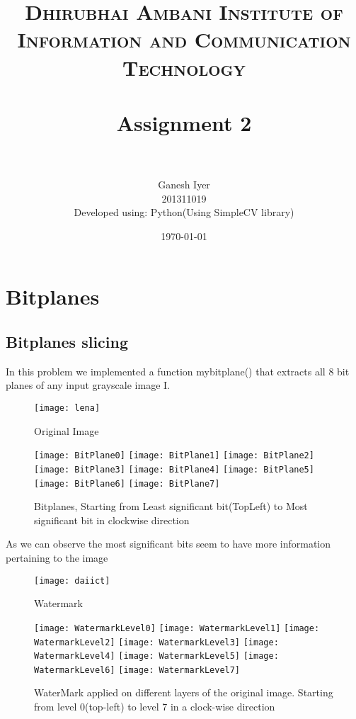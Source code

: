 \documentclass[paper=a4, fontsize=11pt]{scrartcl} %
\title{	
\normalfont \normalsize 
\textsc{Dhirubhai Ambani Institute of Information and Communication Technology} \\ [25pt] %
\horrule{0.5pt} \\[0.4cm] %
\huge Assignment 2 \\ %
\horrule{2pt} \\[0.5cm] %
}
\author{Ganesh Iyer \\ 201311019 \\Developed using: Python(Using SimpleCV library)}
\date{\normalsize\today} %
\numberwithin{equation}{section} %
\numberwithin{figure}{section} %
\numberwithin{table}{section} %
\begin{document}
\maketitle %


\section{Bitplanes}

    \subsection{Bitplanes slicing}
    In this problem we implemented a function mybitplane() that extracts all 8 bit planes of any input grayscale image I. 
    \begin{figure}[h!]
        \centering
        \texttt{[image: lena]}
        \caption{Original Image}
    \end{figure}
    \begin{figure}[h!]
        \centering
        \texttt{[image: BitPlane0]}
        \texttt{[image: BitPlane1]}
        \texttt{[image: BitPlane2]}
        \texttt{[image: BitPlane3]}
        \texttt{[image: BitPlane4]}
        \texttt{[image: BitPlane5]}
        \texttt{[image: BitPlane6]}
        \texttt{[image: BitPlane7]}
        \caption{Bitplanes, Starting from Least significant bit(TopLeft) to Most significant bit in clockwise direction}
    \end{figure}
    As we can observe the most significant bits seem to have more information pertaining to the image
    \begin{figure}[h!]
        \centering
        \texttt{[image: daiict]}
        \caption{Watermark}
    \end{figure}
    \begin{figure}[h!]
        \centering
        \texttt{[image: WatermarkLevel0]}
        \texttt{[image: WatermarkLevel1]}
        \texttt{[image: WatermarkLevel2]}
        \texttt{[image: WatermarkLevel3]}
        \texttt{[image: WatermarkLevel4]}
        \texttt{[image: WatermarkLevel5]}
        \texttt{[image: WatermarkLevel6]}
        \texttt{[image: WatermarkLevel7]}
        \caption{WaterMark applied on different layers of the original image. Starting from level 0(top-left) to level 7 in a clock-wise direction}
    \end{figure}
\end{document}
